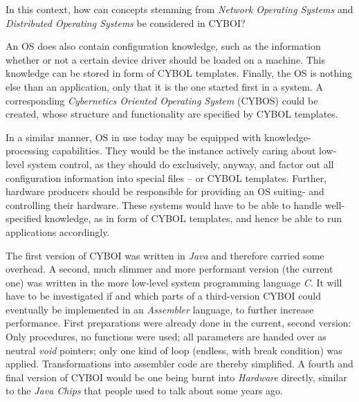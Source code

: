 In this context, how can concepts stemming from \emph{Network Operating Systems}
and \emph{Distributed Operating Systems} \cite[p. 16]{tanenbaum2001} be
considered in CYBOI?


An OS does also contain configuration knowledge, such as the information
whether or not a certain device driver should be loaded on a machine. This
knowledge can be stored in form of CYBOL templates. Finally, the OS is nothing
else than an application, only that it is the one started first in a system.
A corresponding \emph{Cybernetics Oriented Operating System} (CYBOS) could be
created, whose structure and functionality are specified by CYBOL templates.

In a similar manner, OS in use today may be equipped with knowledge-processing
capabilities. They would be the instance actively caring about low-level system
control, as they should do exclusively, anyway, and factor out all configuration
information into special files -- or CYBOL templates. Further, hardware producers
should be responsible for providing an OS suiting- and controlling their hardware.
These systems would have to be able to handle well-specified knowledge, as in
form of CYBOL templates, and hence be able to run applications accordingly.

The first version of CYBOI was written in \emph{Java} and therefore carried
some overhead. A second, much slimmer and more performant version (the current
one) was written in the more low-level system programming language \emph{C}. It
will have to be investigated if and which parts of a third-version CYBOI could
eventually be implemented in an \emph{Assembler} language, to further increase
performance. First preparations were already done in the current, second
version: Only procedures, no functions were used; all parameters are handed
over as neutral \emph{void} pointers; only one kind of loop (endless, with
break condition) was applied. Transformations into assembler code are thereby
simplified. A fourth and final version of CYBOI would be one being burnt into
\emph{Hardware} directly, similar to the \emph{Java Chips} \cite{javachips}
that people used to talk about some years ago.
